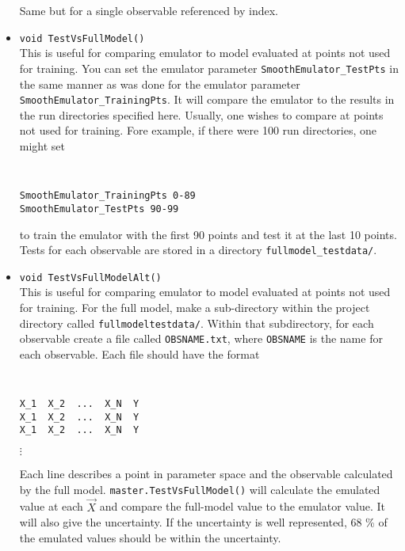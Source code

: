 \documentclass[UserManual.tex]{subfiles}
\begin{document}
\begin{itemize}
Same but for a single observable referenced by index.
\item {\tt void TestVsFullModel()}\\
This is useful for comparing emulator to model evaluated at points not used for training. You can set the emulator parameter {\tt SmoothEmulator\_TestPts} in the same manner as was done for the emulator parameter {\tt SmoothEmulator\_TrainingPts}. It will compare the emulator to the results in the run directories specified here. Usually, one wishes to compare at points not used for training. Fore example, if there were 100 run directories, one might set
{\tt
\begin{verbatim}
SmoothEmulator_TrainingPts 0-89
SmoothEmulator_TestPts 90-99
\end{verbatim}}
to train the emulator with the first 90 points and test it at the last 10 points. Tests for each observable are stored in a directory {\tt fullmodel\_testdata/}.

\item {\tt void TestVsFullModelAlt()}\\
This is useful for comparing emulator to model evaluated at points not used for training. For the full model, make a sub-directory within the project directory called {\tt fullmodeltestdata/}. Within that subdirectory, for each observable create a file called {\tt OBSNAME.txt}, where {\tt OBSNAME} is the name for each observable. Each file should have the format
{\tt
\begin{verbatim}
X_1  X_2  ...  X_N  Y
X_1  X_2  ...  X_N  Y
X_1  X_2  ...  X_N  Y
\end{verbatim}}
\hspace*{36pt}$\vdots$

Each line describes a point in parameter space and the observable calculated by the full model. {\tt master.TestVsFullModel()} will calculate the emulated value at each $\vec{X}$ and compare the full-model value to the emulator value. It will also give the uncertainty. If the uncertainty is well represented, 68 \% of the emulated values should be within the uncertainty.


\end{itemize}
\end{document}
